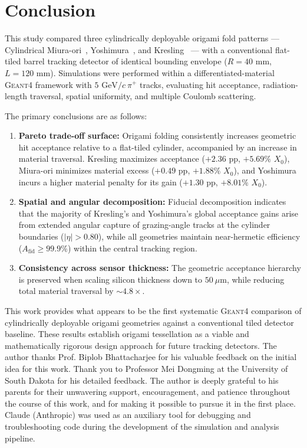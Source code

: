 \documentclass[a4paper,11pt]{article}
\begin{document}
\section{Conclusion}
\label{sec:conclusion}

This study compared three cylindrically deployable origami fold patterns --- Cylindrical Miura-ori~\cite{Miura1985}, Yoshimura~\cite{Yoshimura1955}, and Kresling~\cite{Kresling2008} --- with a conventional flat-tiled barrel tracking detector of identical bounding envelope ($R = 40\text{ mm}$, $L = 120\text{ mm}$). Simulations were performed within a differentiated-material \textsc{Geant4} framework with $5\text{ GeV}/c\ \pi^+$ tracks, evaluating hit acceptance, radiation-length traversal, spatial uniformity, and multiple Coulomb scattering.

The primary conclusions are as follows:
\begin{enumerate}
    \item \textbf{Pareto trade-off surface:} Origami folding consistently increases geometric hit acceptance relative to a flat-tiled cylinder, accompanied by an increase in material traversal. Kresling maximizes acceptance ($+2.36$ pp, $+5.69\%$ $X_0$), Miura-ori minimizes material excess ($+0.49$ pp, $+1.88\%$ $X_0$), and Yoshimura incurs a higher material penalty for its gain ($+1.30$ pp, $+8.01\%$ $X_0$).
    \item \textbf{Spatial and angular decomposition:} Fiducial decomposition indicates that the majority of Kresling's and Yoshimura's global acceptance gains arise from extended angular capture of grazing-angle tracks at the cylinder boundaries ($|\eta| > 0.80$), while all geometries maintain near-hermetic efficiency ($A_{\text{fid}} \ge 99.9\%$) within the central tracking region.
    \item \textbf{Consistency across sensor thickness:} The geometric acceptance hierarchy is preserved when scaling silicon thickness down to $50\ \mu\text{m}$, while reducing total material traversal by $\sim 4.8\times$.
\end{enumerate}

This work provides what appears to be the first systematic \textsc{Geant4} comparison of cylindrically deployable origami geometries against a conventional tiled detector baseline. These results establish origami tessellation as a viable and mathematically rigorous design approach for future tracking detectors.
\acknowledgments
The author thanks Prof. Biplob Bhattacharjee for his valuable feedback on the initial idea for this work. Thank you to Professor Mei Dongming at the University of South Dakota for his detailed feedback. The author is deeply grateful to his parents for their unwavering support, encouragement, and patience throughout the course of this work, and for making it possible to pursue it in the first place. Claude (Anthropic) was used as an auxiliary tool for debugging and troubleshooting code during the development of the simulation and analysis pipeline.
\end{document}
